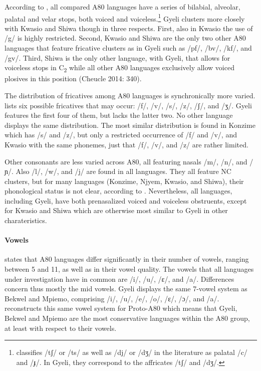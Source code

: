  According to \citet[335]{cheucle2014}, all compared A80 languages have a series of bilabial, alveolar, palatal and velar stops, both voiced and voiceless.\footnote{\citet[335]{cheucle2014} classifies /tʃ/ or /ts/ as well as /dj/ or /dʒ/ in the literature as palatal /c/ and /ɟ/. In Gyeli, they correspond to the affricates /tʃ/ and /dʒ/.} Gyeli clusters more closely with Kwasio and Shiwa though in three respects. First, also in Kwasio the use of /g/ is highly restricted. Second, Kwasio and Shiwa are the only two other A80 languages that feature fricative clusters as in Gyeli such as /pf/, /bv/, /kf/, and /gv/. Third, Shiwa is the only other language, with Gyeli, that allows for voiceless stops in C\textsubscript{2} while all other A80 languages exclusively allow voiced plosives in this position (Cheucle 2014: 340).

The distribution of fricatives among A80 languages is synchronically more varied. \citet[342]{cheucle2014} lists six possible fricatives that may occur: /f/, /v/, /s/, /z/, /ʃ/, and /ʒ/. Gyeli features the first four of them, but lacks the latter two. No other language displays the same distribution. The most similar distribution is found in Konzime which has /s/ and /z/, but only a restricted occurrence of /f/ and /v/, and Kwasio with the same phonemes, just that /f/, /v/, and /z/ are rather limited.

Other consonants are less varied across A80, all featuring nasals /m/, /n/, and /ɲ/. Also /l/, /w/, and /j/ are found in all languages. They all feature NC clusters, but for many languages (Konzime, Njyem, Kwasio, and Shiwa), their phonological status is not clear, according to \citet[348]{cheucle2014}. Nevertheless, all languages, including Gyeli, have both prenasalized voiced and voiceless obstruents, except for Kwasio and Shiwa which are otherwise most similar to Gyeli in other charateristics.


\paragraph{Vowels} \citet[324]{cheucle2014} states that A80 languages differ significantly in their number of vowels, ranging between 5 and 11, as well as in their vowel quality. The vowels that all languages under investigation have in common are /i/, /u/, /ɛ/, and /a/. Differences concern thus mostly the mid vowels. Gyeli displays the same 7-vowel system as Bekwel and Mpiemo, comprising /i/, /u/, /e/, /o/, /ɛ/, /ɔ/, and /a/. \citet[389]{cheucle2014} reconstructs this same vowel system for Proto-A80 which means that Gyeli, Bekwel and Mpiemo are the most conservative languages within the A80 group, at least with respect to their vowels.

